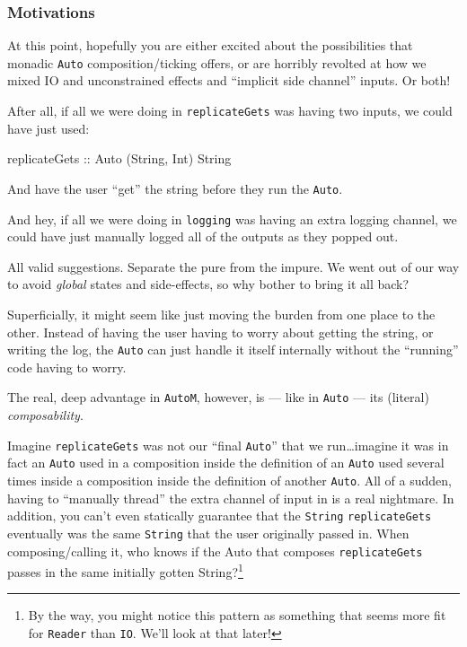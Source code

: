 \documentclass[]{article}
\newenvironment{Shaded}{}{}
\newcommand{\DataTypeTok}[1]{\textcolor[rgb]{0.56,0.13,0.00}{#1}}
\newcommand{\NormalTok}[1]{#1}
\newcommand{\OtherTok}[1]{\textcolor[rgb]{0.00,0.44,0.13}{#1}}
\begin{document}
\hypertarget{motivations}{%
\subsubsection{Motivations}\label{motivations}}

At this point, hopefully you are either excited about the possibilities that
monadic \texttt{Auto} composition/ticking offers, or are horribly revolted at
how we mixed IO and unconstrained effects and ``implicit side channel'' inputs.
Or both!

After all, if all we were doing in \texttt{replicateGets} was having two inputs,
we could have just used:

\begin{Shaded}
\begin{Highlighting}[]
\OtherTok{replicateGets\textquotesingle{} ::} \DataTypeTok{Auto}\NormalTok{ (}\DataTypeTok{String}\NormalTok{, }\DataTypeTok{Int}\NormalTok{) }\DataTypeTok{String}
\end{Highlighting}
\end{Shaded}

And have the user ``get'' the string before they run the \texttt{Auto}.

And hey, if all we were doing in \texttt{logging} was having an extra logging
channel, we could have just manually logged all of the outputs as they popped
out.

All valid suggestions. Separate the pure from the impure. We went out of our way
to avoid \emph{global} states and side-effects, so why bother to bring it all
back?

Superficially, it might seem like just moving the burden from one place to the
other. Instead of having the user having to worry about getting the string, or
writing the log, the \texttt{Auto} can just handle it itself internally without
the ``running'' code having to worry.

The real, deep advantage in \texttt{AutoM}, however, is --- like in
\texttt{Auto} --- its (literal) \emph{composability}.

Imagine \texttt{replicateGets\textquotesingle{}} was not our ``final
\texttt{Auto}'' that we run\ldots imagine it was in fact an \texttt{Auto} used
in a composition inside the definition of an \texttt{Auto} used several times
inside a composition inside the definition of another \texttt{Auto}. All of a
sudden, having to ``manually thread'' the extra channel of input in is a real
nightmare. In addition, you can't even statically guarantee that the
\texttt{String} \texttt{replicateGets} eventually was the same \texttt{String}
that the user originally passed in. When composing/calling it, who knows if the
Auto that composes \texttt{replicateGets\textquotesingle{}} passes in the same
initially gotten String?\footnote{By the way, you might notice this pattern as
  something that seems more fit for \texttt{Reader} than \texttt{IO}. We'll look
  at that later!}
\end{document}
